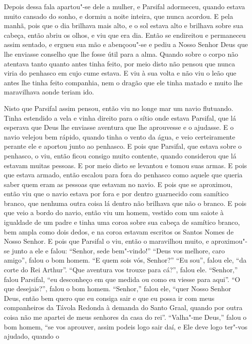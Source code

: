 Depois dessa fala apartou"-se dele a mulher, e Parsifal adormeceu, quando
estava muito cansado do sonho, e dormiu a noite inteira, que nunca acordou. E
pela manhã, pois que o dia brilhava mais alto, e o sol estava alto e brilhava
sobre sua cabeça, então abriu os olhos, e viu que era dia. Então se endireitou
e permaneceu assim sentado, e ergueu sua mão e abençoou"-se e pediu a Nosso
Senhor Deus que lhe enviasse conselho que lhe fosse útil para a alma. Quando
sobre o corpo não atentava tanto quanto antes tinha feito, por meio disto não
pensou que nunca viria do penhasco em cujo cume estava. E viu à sua volta e não
viu o leão que antes lhe tinha feito companhia, nem o dragão que ele tinha
matado e muito lhe maravilhava aonde teriam ido. 

Nisto que Parsifal assim pensou, então viu no longe mar um navio flutuando.
Tinha estendido a vela e vinha direito para o sítio onde estava Parsifal, que
lá esperava que Deus lhe enviasse aventura que lhe aprouvesse e o ajudasse. E o
navio velejou bem rápido, quando tinha o vento da água, e veio certeiramente
perante ele e aportou junto ao penhasco. E pois que Parsifal, que estava sobre
o penhasco, o viu, então ficou consigo muito contente, quando considerou que lá
estavam muitas pessoas. E por meio disto se levantou e tomou suas armas. E pois
que estava armado,  então escalou para fora do penhasco como aquele que queria
saber quem eram as pessoas que estavam no navio. E pois que se aproximou, então
viu que o navio estava por fora e por dentro guarnecido com samítico branco,
que nenhuma outra coisa lá dentro não brilhava que não o branco. E pois que
veio a bordo do navio, então viu um homem, vestido com um saiote à igualdade de
um padre e tinha uma coroa sobre sua cabeça de samítico branco, bem ampla como
dois dedos, e na coroa estavam escritos os Santos Nomes de Nosso Senhor. E pois
que Parsifal o viu, então o maravilhou muito, e aproximou"-se junto a ele e
falou: “Senhor, sede bem"-vindo!” “Deus vos melhore, caro amigo”, falou o bom
homem. “E quem sois vós, Senhor?” “Eu sou”, falou ele, “da corte do Rei
Arthur”. “Que aventura vos trouxe para cá?”, falou ele. “Senhor,” falou
Parsifal, “eu desconheço em que medida ou como eu viesse para aqui”. “O que
desejais?”, falou o bom homem. “Senhor,” falou ele, “quer Nosso Senhor Deus,
então bem quero que eu consiga sair e que eu possa ir com meus companheiros da
Távola Redonda à demanda do Santo Graal, quando por outra coisa não me apartei
de meus senhores da casa do rei”. “Valha"-me Deus,” falou o bom homem, “se vos
aprouver, assim podeis logo sair daí, e Ele deve logo ter"-vos ajudado, quando o

